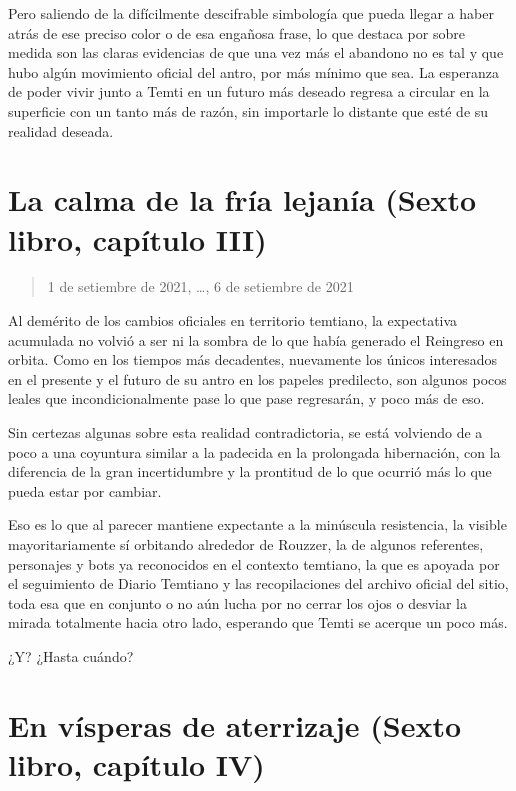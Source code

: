 \documentclass[
  spanish,
]{book}
\begin{document}
Pero saliendo de la difícilmente descifrable simbología que pueda llegar a haber atrás de ese preciso color o de esa engañosa frase, lo que destaca por sobre medida son las claras evidencias de que una vez más el abandono no es tal y que hubo algún movimiento oficial del antro, por más mínimo que sea. La esperanza de poder vivir junto a Temti en un futuro más deseado regresa a circular en la superficie con un tanto más de razón, sin importarle lo distante que esté de su realidad deseada.

\hypertarget{la-calma-de-la-fruxeda-lejanuxeda-sexto-libro-capuxedtulo-iii}{%
\section{La calma de la fría lejanía (Sexto libro, capítulo III)}\label{la-calma-de-la-fruxeda-lejanuxeda-sexto-libro-capuxedtulo-iii}}

\begin{quote}
1 de setiembre de 2021, \ldots, 6 de setiembre de 2021
\end{quote}

Al demérito de los cambios oficiales en territorio temtiano, la expectativa acumulada no volvió a ser ni la sombra de lo que había generado el Reingreso en orbita. Como en los tiempos más decadentes, nuevamente los únicos interesados en el presente y el futuro de su antro en los papeles predilecto, son algunos pocos leales que incondicionalmente pase lo que pase regresarán, y poco más de eso.

Sin certezas algunas sobre esta realidad contradictoria, se está volviendo de a poco a una coyuntura similar a la padecida en la prolongada hibernación, con la diferencia de la gran incertidumbre y la prontitud de lo que ocurrió más lo que pueda estar por cambiar.

Eso es lo que al parecer mantiene expectante a la minúscula resistencia, la visible mayoritariamente sí orbitando alrededor de Rouzzer, la de algunos referentes, personajes y bots ya reconocidos en el contexto temtiano, la que es apoyada por el seguimiento de Diario Temtiano y las recopilaciones del archivo oficial del sitio, toda esa que en conjunto o no aún lucha por no cerrar los ojos o desviar la mirada totalmente hacia otro lado, esperando que Temti se acerque un poco más.

¿Y? ¿Hasta cuándo?

\hypertarget{en-vuxedsperas-de-aterrizaje-sexto-libro-capuxedtulo-iv}{%
\section{En vísperas de aterrizaje (Sexto libro, capítulo IV)}\label{en-vuxedsperas-de-aterrizaje-sexto-libro-capuxedtulo-iv}}
\end{document}
